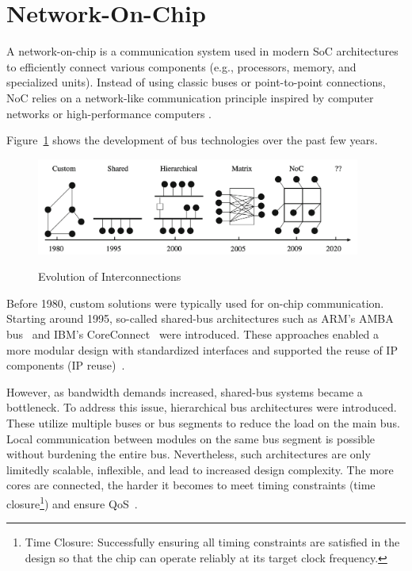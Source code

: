 \section{Network-On-Chip}

A network-on-chip is a communication system used in modern \acs{SoC} architectures to efficiently connect various components (e.g., processors, memory, and specialized units). Instead of using classic buses or point-to-point connections, \ac{NoC} relies on a network-like communication principle inspired by computer networks or high-performance computers \cite{serpanos_architecture_2011}.

Figure~\ref{fig:Evolution_of_Interconnection} shows the development of bus technologies over the past few years.
\begin{figure}[htbp]
    \centering
    \includegraphics[width=0.95\textwidth]{img/Evolution of On-Chip communication interconnect.png}
    \caption{Evolution of Interconnections}
    \cite{abderazek_multicore_2013}
    \label{fig:Evolution_of_Interconnection}
\end{figure}

Before 1980, custom solutions were typically used for on-chip communication. Starting around 1995, so-called shared-bus architectures such as ARM’s AMBA bus~\cite{arm_amba_nodate} and IBM’s CoreConnect~\cite{international_business_machines_corporation_coreconnect_1999} were introduced. These approaches enabled a more modular design with standardized interfaces and supported the reuse of IP components (IP reuse)~\cite{unnikrishnan_network_2021}.

However, as bandwidth demands increased, shared-bus systems became a bottleneck. To address this issue, hierarchical bus architectures were introduced. These utilize multiple buses or bus segments to reduce the load on the main bus. Local communication between modules on the same bus segment is possible without burdening the entire bus. Nevertheless, such architectures are only limitedly scalable, inflexible, and lead to increased design complexity. The more cores are connected, the harder it becomes to meet timing constraints (time closure\footnote{Time Closure: Successfully ensuring all timing constraints are satisfied in the design so that the chip can operate reliably at its target clock frequency.}) and ensure \ac{QoS}~\cite{unnikrishnan_network_2021}.

